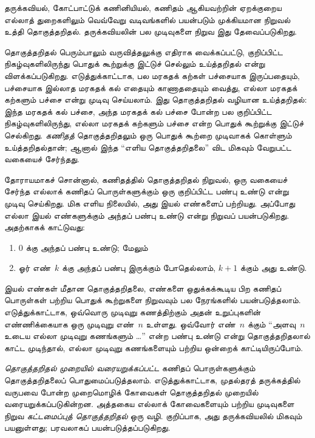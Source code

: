 \documentclass[../../../include/open-logic-section]{subfiles}
\begin{document}


தருக்கவியல், கோட்பாட்டுக் கணினியியல், கணிதம் ஆகியவற்றின்
ஏறக்குறைய எல்லாத் துறைகளிலும் வெவ்வேறு வடிவங்களில்
பயன்படும் முக்கியமான நிறுவல் உத்தி தொகுத்தறிதல்.
தருக்கவியலின் பல முடிவுகளை நிறுவ இது தேவைப்படுகிறது.

தொகுத்தறிதல் பெரும்பாலும் வருவித்தலுக்கு எதிராக
வைக்கப்பட்டு, குறிப்பிட்ட நிகழ்வுகளிலிருந்து பொதுக்
கூற்றுக்கு இட்டுச் செல்லும் உய்த்தறிதல் என்று
விளக்கப்படுகிறது. எடுத்துக்காட்டாக, பல மரகதக் கற்கள்
பச்சையாக இருப்பதையும், பச்சையாக இல்லாத மரகதக் கல்
எதையும் காணாததையும் வைத்து, எல்லா மரகதக் கற்களும்
பச்சை என்று முடிவு செய்யலாம். இது தொகுத்தறிதல் வழியான
உய்த்தறிதல்: இந்த மரகதக் கல் பச்சை, அந்த மரகதக் கல்
பச்சை போன்ற பல குறிப்பிட்ட நிகழ்வுகளிலிருந்து,
எல்லா மரகதக் கற்களும் பச்சை என்ற பொதுக் கூற்றுக்கு
இட்டுச் செல்கிறது. \emph{கணிதத்} தொகுத்தறிதலும்
ஒரு பொதுக் கூற்றை முடிவாகக் கொள்ளும் உய்த்தறிதல்தான்;
ஆனால் இந்த ``எளிய தொகுத்தறிதலை'' விட மிகவும்
வேறுபட்ட வகையைச் சேர்ந்தது.

தோராயமாகச் சொன்னால், கணிதத்தில் தொகுத்தறிதல் நிறுவல்,
ஒரு வகையைச் சேர்ந்த எல்லாக் கணிதப் பொருள்களுக்கும்
ஒரு குறிப்பிட்ட பண்பு உண்டு என்று முடிவு செய்கிறது.
மிக எளிய நிலையில், அது இயல் எண்களைப் பற்றியது.
அப்போது எல்லா இயல் எண்களுக்கும் அந்தப் பண்பு உண்டு
என்று நிறுவப் பயன்படுகிறது. அதற்காகக் காட்டுவது:
\begin{enumerate}
    \item $0$ க்கு அந்தப் பண்பு உண்டு; மேலும்
    \item ஓர் எண்~$k$ க்கு அந்தப் பண்பு இருக்கும்
    போதெல்லாம், $k+1$ க்கும் அது உண்டு.
\end{enumerate}

இயல் எண்கள் மீதான தொகுத்தறிதலை, எண்களை ஒதுக்கக்கூடிய
பிற கணிதப் பொருள்கள் பற்றிய பொதுக் கூற்றுகளை நிறுவவும்
பல நேரங்களில் பயன்படுத்தலாம். எடுத்துக்காட்டாக,
ஒவ்வொரு முடிவுறு கணத்திற்கும் அதன் உறுப்புகளின்
எண்ணிக்கையாக ஒரு முடிவுறு எண்~$n$ உள்ளது.
ஒவ்வோர் எண்~$n$ க்கும் ``அளவு~$n$ உடைய
எல்லா முடிவுறு கணங்களும் \dots'' என்ற பண்பு உண்டு
என்று தொகுத்தறிதலால் காட்ட முடிந்தால், எல்லா
முடிவுறு கணங்களையும் பற்றிய ஒன்றைக் காட்டியிருப்போம்.

\emph{தொகுத்தறிதல் முறையில் வரையறுக்கப்பட்ட} கணிதப்
பொருள்களுக்கும் தொகுத்தறிதலைப் பொதுமைப்படுத்தலாம்.
எடுத்துக்காட்டாக, முதல்தரத் தருக்கத்தில் வருபவை போன்ற
முறைமொழிக் கோவைகள் தொகுத்தறிதல் முறையில்
வரையறுக்கப்படுகின்றன. அத்தகைய எல்லாக் கோவைகளையும்
பற்றிய முடிவுகளை நிறுவ \emph{கட்டமைப்புத் தொகுத்தறிதல்}
ஒரு வழி. குறிப்பாக, அது தருக்கவியலில் மிகவும்
பயனுள்ளது; பரவலாகப் பயன்படுத்தப்படுகிறது.
\end{document}
